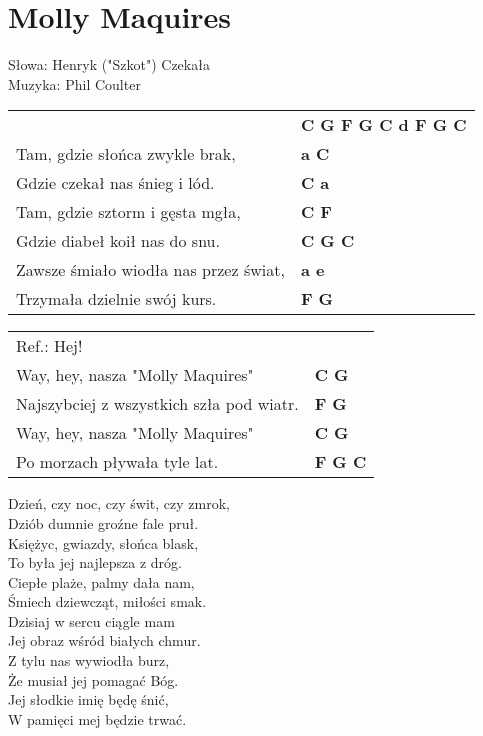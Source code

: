 \section{Molly Maquires}

Słowa: Henryk ("Szkot") Czekała  \\
Muzyka: Phil Coulter

\vspace{2em}
\begin{tabular}{@{}p{9cm}@{}l@{}}
 & \bfseries  C G F G C d F G C \\
Tam, gdzie słońca zwykle brak, & \bfseries  a C \\
Gdzie czekał nas śnieg i lód. & \bfseries  C a \\
Tam, gdzie sztorm i gęsta mgła, & \bfseries  C F \\
Gdzie diabeł koił nas do snu. & \bfseries  C G C \\
Zawsze śmiało wiodła nas przez świat, & \bfseries  a e \\
Trzymała dzielnie swój kurs. & \bfseries  F G \\
\end{tabular}

\vspace{1em}
\begin{tabular}{@{}p{9cm}@{}l@{}}
Ref.: Hej! \\
Way, hey, nasza "Molly Maquires" & \bfseries  C G \\
Najszybciej z wszystkich szła pod wiatr. & \bfseries  F G \\
Way, hey, nasza "Molly Maquires" & \bfseries  C G \\
Po morzach pływała tyle lat. & \bfseries  F G C \\
\end{tabular}

\vspace{1em}
Dzień, czy noc, czy świt, czy zmrok, \\
Dziób dumnie groźne fale pruł. \\
Księżyc, gwiazdy, słońca blask, \\
To była jej najlepsza z dróg. \\
Ciepłe plaże, palmy dała nam, \\
Śmiech dziewcząt, miłości smak. \\

Dzisiaj w sercu ciągle mam \\
Jej obraz wśród białych chmur. \\
Z tylu nas wywiodła burz, \\
Że musiał jej pomagać Bóg. \\
Jej słodkie imię będę śnić, \\
W pamięci mej będzie trwać. \\